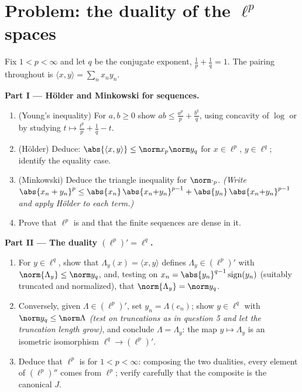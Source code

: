 \section{Problem: the duality of the \texorpdfstring{$\ell^p$}%
{lp} spaces}

\begin{problem}[{Weekend problem --- $(\ell^p)' = \ell^q$,
reflexivity, and the strangeness of $\ell^\infty$}]
\label{pb:b3:banach:1}
Fix $1 < p < \infty$ and let $q$ be the conjugate exponent,
$\frac1p + \frac1q = 1$. The pairing throughout is $\langle x,
y\rangle = \sum_n x_ny_n$.

\medskip
\noindent\textbf{Part I --- H\"older and Minkowski for
sequences.}
\begin{enumerate}
  \item (Young's inequality) For $a, b \geq 0$ show $ab \leq
        \frac{a^p}p + \frac{b^q}q$, using concavity of $\log$ or
        by studying $t \mapsto \frac{t^p}p + \frac1q - t$.
  \item (H\"older) Deduce: $\abs{\langle x, y\rangle} \leq
        \norm x_p\norm y_q$ for $x \in \ell^p$, $y \in \ell^q$;
        identify the equality case.
  \item (Minkowski) Deduce the triangle inequality for
        $\norm\cdot_p$. \emph{(Write $\abs{x_n + y_n}^p \leq
        \abs{x_n}\,\abs{x_n{+}y_n}^{p-1} +
        \abs{y_n}\,\abs{x_n{+}y_n}^{p-1}$ and apply H\"older to
        each term.)}
  \item Prove that $\ell^p$ is  and that the finite
        sequences are dense in it.
\end{enumerate}

\medskip
\noindent\textbf{Part II --- The duality $(\ell^p)' =
\ell^q$.}
\begin{enumerate}[resume]
  \item For $y \in \ell^q$, show that $\Lambda_y(x) = \langle
        x, y\rangle$ defines $\Lambda_y \in (\ell^p)'$ with
        $\norm{\Lambda_y} \leq \norm y_q$, and, testing on
        $x_n = \abs{y_n}^{q-1}\operatorname{sign}(y_n)$
        (suitably truncated and normalized), that
        $\norm{\Lambda_y} = \norm y_q$.
  \item Conversely, given $\Lambda \in (\ell^p)'$, set $y_n =
        \Lambda(e_n)$; show $y \in \ell^q$ with $\norm y_q \leq
        \norm\Lambda$ \emph{(test on truncations as in question
        5 and let the truncation length grow)}, and conclude
        $\Lambda = \Lambda_y$: the map $y \mapsto \Lambda_y$ is
        an isometric isomorphism $\ell^q \to (\ell^p)'$.
  \item Deduce that $\ell^p$ is \emph{} for $1 < p <
        \infty$: composing the two dualities, every element of
        $(\ell^p)''$ comes from $\ell^p$; verify carefully that
        the composite is the canonical $J$.
\end{enumerate}


\end{problem}
